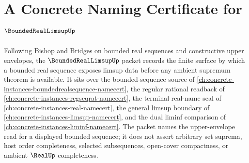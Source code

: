 \chapter{A Concrete Naming Certificate for $\BoundedRealLimsupUp$}
\label{ch:concrete-instances-bounded-real-limsup-namecert}

Following Bishop and Bridges on bounded real sequences and constructive upper envelopes, the $\BoundedRealLimsupUp$ packet records the finite surface by which a bounded real sequence exposes limsup data before any ambient supremum theorem is available. It sits over the bounded-sequence source of \autoref{ch:concrete-instances-boundedrealsequence-namecert}, the regular rational readback of \autoref{ch:concrete-instances-regseqrat-namecert}, the terminal real-name seal of \autoref{ch:concrete-instances-real-namecert}, the general limsup boundary of \autoref{ch:concrete-instances-limsup-namecert}, and the dual liminf comparison of \autoref{ch:concrete-instances-liminf-namecert}. The packet names the upper-envelope read for a displayed bounded sequence; it does not assert arbitrary set suprema, host order completeness, selected subsequences, open-cover compactness, or ambient $\RealUp$ completeness.

